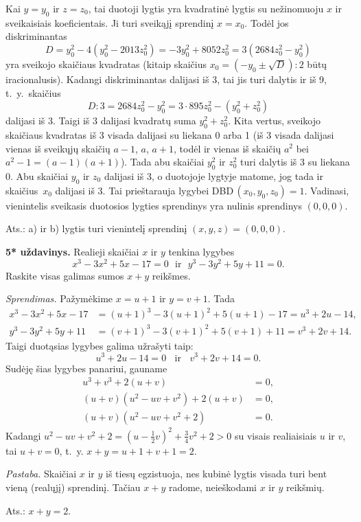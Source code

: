 \documentclass[11pt,a4paper]{article}
\begin{document}
Kai $y=y_0$ ir $z=z_0$, tai duotoji lygtis yra kvadratinė lygtis su nežinomuoju $x$ ir sveikaisiais koeficientais. Ji turi sveikąjį sprendinį $x=x_0$. Todėl jos 
diskriminantas 
\[
D = y_0^2 - 4(y_0^2-2013z_0^2) = -3y_0^2 + 8052z_0^2 = 3(2684z_0^2 - y_0^2)
\]
yra sveikojo skaičiaus kvadratas (kitaip skaičius $x_0=\left(-y_0\pm\sqrt{D}\right):2$ būtų iracionalusis). Kadangi diskriminantas dalijasi iš 3, 
tai jis turi dalytis ir iš 9, t.~y.~skaičius 
\[
D:3 = 2684z_0^2 - y_0^2 =3\cdot 895 z_0^2 -(y_0^2 + z_0^2)
\] 
dalijasi iš 3. Taigi iš 3 dalijasi kvadratų suma $y_0^2 + z_0^2$. 
Kita vertus, sveikojo skaičiaus kvadratas iš 3 visada dalijasi su liekana 0 arba 1 (iš 3 visada dalijasi vienas iš sveikųjų skaičių $a-1$, $a$, $a+1$, todėl ir vienas iš skaičių $a^2$ bei $a^2-1 = (a-1)(a+1)$). Tada abu skaičiai $y_0^2$ ir $z_0^2$ turi dalytis iš 3 su liekana 0. Abu skaičiai $y_0$ ir $z_0$ dalijasi iš 3, o duotojoje
lygtyje matome, jog tada ir skaičius~$x_0$ dalijasi iš 3. Tai prieštarauja lygybei DBD\,$(x_0,y_0,z_0) = 1$. Vadinasi, vienintelis sveikasis duotosios lygties sprendinys yra nulinis sprendinys $(0, 0, 0)$.
       \begin{flushright}
     Ats.: a) ir b) lygtis turi vienintelį sprendinį $(x,y,z) = (0,0,0)$.
    \end{flushright}
\vspace{5.5mm}


\textbf{5* uždavinys.} Realieji skaičiai $x$ ir $y$ tenkina lygybes
\[
x^3 - 3x^2 + 5x - 17 = 0 ~~~\text{ir}~~~ y^3 - 3y^2 + 5y + 11 = 0.
\]
Raskite visas galimas sumos $x + y$ reikšmes.
\vspace{2.3mm}

\textit{Sprendimas.} Pažymėkime $x = u+1$ ir $y = v+1$. Tada
\begin{align*}
x^3 - 3x^2 + 5x - 17 &= (u+1)^3 -3(u+1)^2 + 5(u+1) - 17 = u^3 + 2u - 14,\\
y^3 - 3y^2 + 5y +11 &= (v+1)^3 -3(v+1)^2 + 5(v+1) + 11 = v^3 + 2v + 14.
\end{align*}
Taigi duotąsias lygybes galima užrašyti taip: 
\[
u^3 + 2u - 14 = 0 \;\; \textrm{ ir }\;\; v^3 + 2v + 14 = 0.
\]
Sudėję šias lygybes panariui, gauname
\begin{align*}
u^3 + v^3 + 2(u+v) &=0,\\
(u+v)(u^2 - uv + v^2) + 2(u+v) &= 0,\\
(u+v)(u^2 - uv + v^2 +2)& = 0.\end{align*}
Kadangi $u^2 - uv + v^2 +2 = \left(u -\frac{1}{2}v\right)^2 + \frac{3}{4}v^2 + 2 >0$ su visais realiaisiais 
$u$ ir $v$, tai $u+v = 0$, t.~y. $x+y = u+1+v+1 = 2$.

\emph{Pastaba.} Skaičiai $x$ ir $y$ iš tiesų egzistuoja, nes kubinė lygtis visada turi bent vieną (realųjį) sprendinį. Tačiau $x+y$ radome, neieškodami $x$ ir $y$ reikšmių.
       \begin{flushright}
     Ats.: $x+y = 2$.
    \end{flushright}




\vspace{0,7cm}
\end{document}
